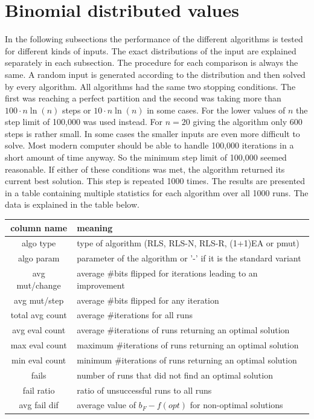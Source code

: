 \section{Binomial distributed values}
In the following subsections the performance of the different algorithms is tested for different kinds of inputs.
The exact distributions of the input are explained separately in each subsection.
The procedure for each comparison is always the same. A random input is generated according to the distribution and then solved by every algorithm.
All algorithms had the same two stopping conditions.
The first was reaching a perfect partition and the second was taking more than $100 \cdot n\ln(n)$ steps or $10 \cdot n\ln(n)$ in some cases.
For the lower values of $n$ the step limit of 100,000 was used instead.
For $n=20$ giving the algorithm only 600 steps is rather small.
In some cases the smaller inputs are even more difficult to solve.
Most modern computer should be able to handle 100,000 iterations in a short amount of time anyway.
So the minimum step limit of 100,000 seemed reasonable.
If either of these conditions was met, the algorithm returned its current best solution.
This step is repeated 1000 times.
The results are presented in a table containing multiple statistics for each algorithm over all 1000 runs.
The data is explained in the table below.

\begin{tabular}{c|l}
      column name     & meaning                                                         \\ \hline
      algo type       & type of algorithm (RLS, RLS-N, RLS-R, (1+1)EA or pmut)          \\
      algo param      & parameter of the algorithm or '-' if it is the standard variant \\
      avg mut/change  & average \#bits flipped for iterations leading to an improvement \\
      avg mut/step    & average \#bits flipped for any iteration                        \\ \hline
      total avg count & average \#iterations for all runs                               \\
      avg eval count  & average \#iterations of runs returning an optimal solution      \\
      max eval count  & maximum \#iterations of runs returning an optimal solution      \\
      min eval count  & minimum \#iterations of runs returning an optimal solution      \\ \hline
      fails           & number of runs that did not find an optimal solution            \\
      fail ratio      & ratio of unsuccessful runs to all runs                          \\
      avg fail dif    & average value of $b_F-f(opt)$ for non-optimal solutions         \\
\end{tabular}

